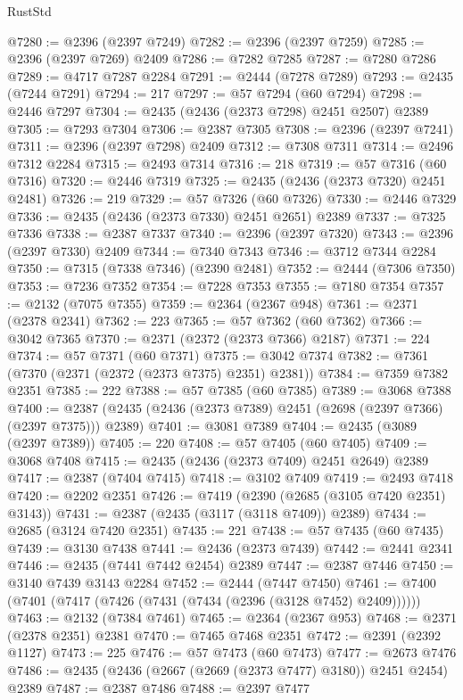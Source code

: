 \begin{lexlean}{RustStd}
\begin{coremodule}
@7280 := @2396 (@2397 @7249)
@7282 := @2396 (@2397 @7259)
@7285 := @2396 (@2397 @7269) @2409
@7286 := @7282 @7285
@7287 := @7280 @7286
@7289 := @4717 @7287 @2284
@7291 := @2444 (@7278 @7289)
@7293 := @2435 (@7244 @7291)
@7294 := 217
@7297 := @57 @7294 (@60 @7294)
@7298 := @2446 @7297
@7304 := @2435 (@2436 (@2373 @7298) @2451 @2507) @2389
@7305 := @7293 @7304
@7306 := @2387 @7305
@7308 := @2396 (@2397 @7241)
@7311 := @2396 (@2397 @7298) @2409
@7312 := @7308 @7311
@7314 := @2496 @7312 @2284
@7315 := @2493 @7314
@7316 := 218
@7319 := @57 @7316 (@60 @7316)
@7320 := @2446 @7319
@7325 := @2435 (@2436 (@2373 @7320) @2451 @2481)
@7326 := 219
@7329 := @57 @7326 (@60 @7326)
@7330 := @2446 @7329
@7336 := @2435 (@2436 (@2373 @7330) @2451 @2651) @2389
@7337 := @7325 @7336
@7338 := @2387 @7337
@7340 := @2396 (@2397 @7320)
@7343 := @2396 (@2397 @7330) @2409
@7344 := @7340 @7343
@7346 := @3712 @7344 @2284
@7350 := @7315 (@7338 @7346) (@2390 @2481)
@7352 := @2444 (@7306 @7350)
@7353 := @7236 @7352
@7354 := @7228 @7353
@7355 := @7180 @7354
@7357 := @2132 (@7075 @7355)
@7359 := @2364 (@2367 @948)
@7361 := @2371 (@2378 @2341)
@7362 := 223
@7365 := @57 @7362 (@60 @7362)
@7366 := @3042 @7365
@7370 := @2371 (@2372 (@2373 @7366) @2187)
@7371 := 224
@7374 := @57 @7371 (@60 @7371)
@7375 := @3042 @7374
@7382 := @7361 (@7370 (@2371 (@2372 (@2373 @7375) @2351) @2381))
@7384 := @7359 @7382 @2351
@7385 := 222
@7388 := @57 @7385 (@60 @7385)
@7389 := @3068 @7388
@7400 := @2387 (@2435 (@2436 (@2373 @7389) @2451 (@2698 (@2397 @7366) (@2397 @7375))) @2389)
@7401 := @3081 @7389
@7404 := @2435 (@3089 (@2397 @7389))
@7405 := 220
@7408 := @57 @7405 (@60 @7405)
@7409 := @3068 @7408
@7415 := @2435 (@2436 (@2373 @7409) @2451 @2649) @2389
@7417 := @2387 (@7404 @7415)
@7418 := @3102 @7409
@7419 := @2493 @7418
@7420 := @2202 @2351
@7426 := @7419 (@2390 (@2685 (@3105 @7420 @2351) @3143))
@7431 := @2387 (@2435 (@3117 (@3118 @7409)) @2389)
@7434 := @2685 (@3124 @7420 @2351)
@7435 := 221
@7438 := @57 @7435 (@60 @7435)
@7439 := @3130 @7438
@7441 := @2436 (@2373 @7439)
@7442 := @2441 @2341
@7446 := @2435 (@7441 @7442 @2454) @2389
@7447 := @2387 @7446
@7450 := @3140 @7439 @3143 @2284
@7452 := @2444 (@7447 @7450)
@7461 := @7400 (@7401 (@7417 (@7426 (@7431 (@7434 (@2396 (@3128 @7452) @2409))))))
@7463 := @2132 (@7384 @7461)
@7465 := @2364 (@2367 @953)
@7468 := @2371 (@2378 @2351) @2381
@7470 := @7465 @7468 @2351
@7472 := @2391 (@2392 @1127)
@7473 := 225
@7476 := @57 @7473 (@60 @7473)
@7477 := @2673 @7476
@7486 := @2435 (@2436 (@2667 (@2669 (@2373 @7477) @3180)) @2451 @2454) @2389
@7487 := @2387 @7486
@7488 := @2397 @7477

\end{coremodule}
\end{lexlean}
